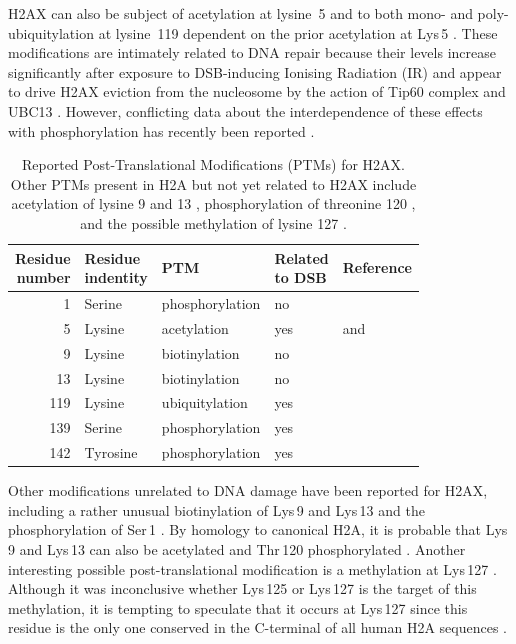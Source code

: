 H2AX can also be subject of acetylation at lysine~5 \citep{PB81} and
to both mono- and poly-ubiquitylation at lysine~119 dependent on the
prior acetylation at Lys\,5 
\citep{ITK+07}. These modifications are intimately related to DNA
repair because their levels increase significantly after exposure to
DSB-inducing Ionising Radiation (IR) and appear to drive H2AX eviction
from the nucleosome by the action of Tip60 complex and UBC13
\citep{ITK+07}. However, conflicting data about the interdependence of
these effects with phosphorylation has recently been reported
\citep{RVD+09}.

\begin{table}
\centering
\caption[Reported Post-Translational Modifications (PTMs) for H2AX]%
        {Reported Post-Translational Modifications (PTMs) for
          H2AX\@. Other PTMs present in H2A but not yet related to
          H2AX include acetylation of lysine 9 and 13 \citep{ZEP+03},
          phosphorylation of threonine 120 \citep{ANY+04}, and the
          possible methylation of lysine 127 \citep{ZEP+03}.}
\label{tab:h2ax-review:H2AX-PTM}
\begin{tabularx}{\linewidth}{r l l l >{\raggedright\arraybackslash}X}
\toprule
\makecell{Residue\\number} & \makecell{Residue\\indentity} & PTM & \makecell{Related\\to DSB} & Reference  \\
\midrule
1   & Serine & phosphorylation & no  & \citet{PB81} \\
5   & Lysine    & acetylation     & yes & \citet{PB81} and \citet{ITK+07} \\
9   & Lysine    & biotinylation   & no  & \citet{CCK+06} \\
13  & Lysine   & biotinylation   & no  & \citet{CCK+06} \\
119 & Lysine  & ubiquitylation  & yes & \citet{ITK+07} \\
139 & Serine  & phosphorylation & yes & \citet{EPR+98} \\
142 & Tyrosine  & phosphorylation & yes & \citet{XLS+09} \\
\bottomrule
\end{tabularx}
\end{table}

Other modifications unrelated to DNA damage have been reported for
H2AX, including a rather unusual biotinylation of Lys\,9 and Lys\,13
\citep{CCK+06} and the phosphorylation of Ser\,1 \citep{PB81}. By
homology to canonical H2A, it is probable that Lys\,9 and Lys\,13 can
also be acetylated \citep{ZEP+03} and Thr\,120 phosphorylated
\citep{ANY+04}. Another interesting possible post-translational
modification is a methylation at Lys\,127 \citep{ZEP+03}. Although it
was inconclusive whether Lys\,125 or Lys\,127 is the target of this
methylation, it is tempting to speculate that it occurs at Lys\,127
since this residue is the only one conserved in the C-terminal of all
human H2A sequences .

